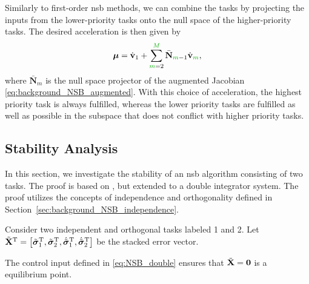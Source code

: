 Similarly to first-order \gls{nsb} methods, we can combine the tasks by projecting the inputs from the lower-priority tasks onto the null space of the higher-priority tasks.
The desired acceleration is then given by
\begin{equation}
    \bm{\mu} = \dot{\ivel}_1 + \sum_{\dm{m}=2}^{\dm{M}} \bar{\mathbf{N}}_{\dm{m}-1}\dot{\ivel}_{\dm{m}},
    \label{eq:NSB_double}
\end{equation}
where  $\bar{\mathbf{N}}_m$ is the null space projector of the augmented Jacobian \eqref{eq:background_NSB_augmented}.
With this choice of acceleration, the highest priority task is always fulfilled, whereas the lower priority tasks are fulfilled as well as possible in the subspace that does not conflict with higher priority tasks.

\subsection{Stability Analysis}
In this section, we investigate the stability of an \gls{nsb} algorithm consisting of two tasks.
The proof is based on \cite{antonelli_stability_2008}, but extended to a double integrator system.
The proof utilizes the concepts of independence and orthogonality defined in Section~\ref{sec:background_NSB_independence}.

\begin{lemma}\label{theorem:one}
    Consider two independent and orthogonal tasks labeled 1 and 2.
    Let
    $
        \Tilde{\mathbf{X}}^{\mathrm{T}} = \left[\Tilde{\bm{\sigma}}_1^{\mathrm{T}}, \Tilde{\bm{\sigma}}_2^{\mathrm{T}}, \dot{\Tilde{\bm{\sigma}}}_1^{\mathrm{T}}, \dot{\Tilde{\bm{\sigma}}}_2^{\mathrm{T}} \right]
    $
    be the stacked error vector.

    The control input defined in \eqref{eq:NSB_double} ensures that $\Tilde{\mathbf{X}} = \mathbf{0}$ is a  equilibrium point.
\end{lemma}

